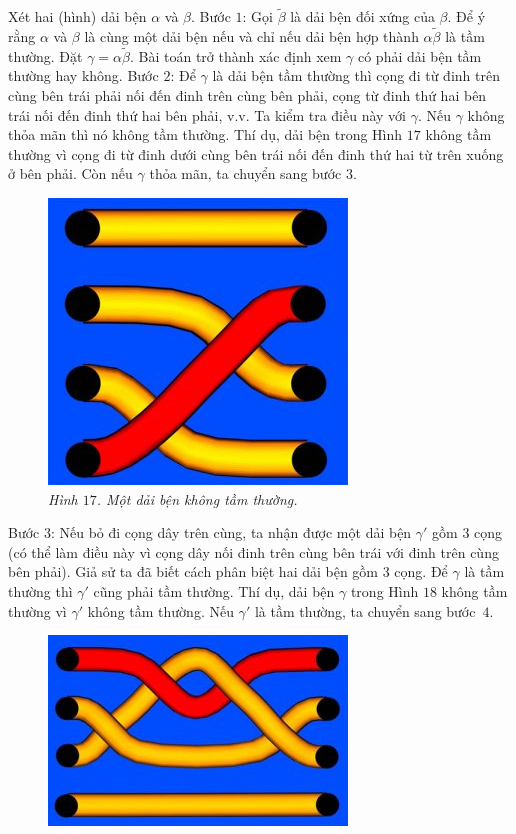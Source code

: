 \begin{multicols}{2}
	\vskip 0.1cm
	Xét hai (hình) dải bện $\alpha$ và $\beta$.
	\vskip 0.1cm
	Bước $1$: Gọi $\tilde \beta$ là dải bện đối xứng của $\beta$. Để ý rằng $\alpha$ và $\beta$ là cùng một dải bện nếu và chỉ nếu dải bện hợp thành $\alpha \tilde \beta$ là tầm thường. Đặt $\gamma = \alpha \tilde \beta$. Bài toán trở thành xác định xem $\gamma$ có phải dải bện tầm thường hay không.
	\vskip 0.1cm
	Bước $2$: Để $\gamma$ là dải bện tầm thường thì cọng đi từ đinh trên cùng bên trái phải nối đến đinh trên cùng bên phải, cọng từ đinh thứ hai bên trái nối đến đinh thứ hai bên phải, v.v. Ta kiểm tra điều này với $\gamma$. Nếu $\gamma$ không thỏa mãn thì nó không tầm thường. Thí dụ, dải bện trong Hình $17$ không tầm thường vì cọng đi từ đinh dưới cùng bên trái nối đến đinh thứ hai từ trên xuống ở bên phải. Còn nếu $\gamma$ thỏa mãn, ta chuyển sang bước $3$.
	\begin{figure}[H]
		\vspace*{-5pt}
		\centering
		\captionsetup{labelformat= empty, justification=centering}
		\includegraphics[width= 0.48\linewidth]{fig_17}
		\caption{\small\textit{\color{duongvaotoanhoc}Hình $17$. Một dải bện không tầm thường.}}
		\vspace*{-10pt}
	\end{figure}
	Bước $3$: Nếu bỏ đi cọng dây trên cùng, ta nhận được một dải bện $\gamma'$ gồm $3$ cọng (có thể làm điều này vì cọng dây nối đinh trên cùng bên trái với đinh trên cùng bên phải). Giả sử ta đã biết cách phân biệt hai dải bện gồm $3$ cọng. Để $\gamma$ là tầm thường thì $\gamma'$ cũng phải tầm thường. Thí dụ, dải bện $\gamma$ trong Hình $18$ không tầm thường vì $\gamma'$ không tầm thường. Nếu $\gamma'$ là tầm thường, ta chuyển sang bước~$4$.
	\begin{figure}[H]
		\vspace*{-5pt}
		\centering
		\captionsetup{labelformat= empty, justification=centering}
		\includegraphics[width= 0.48\linewidth]{fig_18}

\end{figure}
\end{multicols}
